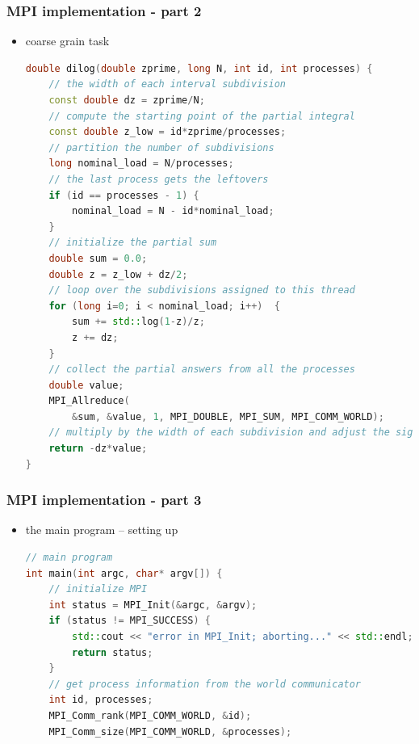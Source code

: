 \begin{frame}[fragile]
%
  \frametitle{MPI implementation - part 2}
%
  \begin{itemize}
  \item coarse grain task
  \begin{lstlisting}[language=c++,name=mpi]
double dilog(double zprime, long N, int id, int processes) {
    // the width of each interval subdivision
    const double dz = zprime/N;
    // compute the starting point of the partial integral
    const double z_low = id*zprime/processes;
    // partition the number of subdivisions
    long nominal_load = N/processes;
    // the last process gets the leftovers
    if (id == processes - 1) {
        nominal_load = N - id*nominal_load;
    }
    // initialize the partial sum
    double sum = 0.0;
    double z = z_low + dz/2;
    // loop over the subdivisions assigned to this thread
    for (long i=0; i < nominal_load; i++)  {
        sum += std::log(1-z)/z;
        z += dz;
    }
    // collect the partial answers from all the processes
    double value;
    MPI_Allreduce(
        &sum, &value, 1, MPI_DOUBLE, MPI_SUM, MPI_COMM_WORLD);
    // multiply by the width of each subdivision and adjust the sign
    return -dz*value;
}
  \end{lstlisting}
%
  \end{itemize}
%
\end{frame}

\begin{frame}[fragile]
%
  \frametitle{MPI implementation - part 3}
%
  \begin{itemize}
  \item the main program -- setting up \mpi
  \begin{lstlisting}[language=c++,name=mpi]
// main program
int main(int argc, char* argv[]) {
    // initialize MPI
    int status = MPI_Init(&argc, &argv);
    if (status != MPI_SUCCESS) {
        std::cout << "error in MPI_Init; aborting..." << std::endl;
        return status;
    }
    // get process information from the world communicator
    int id, processes;
    MPI_Comm_rank(MPI_COMM_WORLD, &id);
    MPI_Comm_size(MPI_COMM_WORLD, &processes);

  \end{lstlisting}
%
  \end{itemize}
%
\end{frame}

